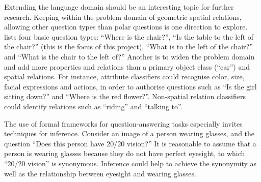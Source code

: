 Extending the language domain should be an interesting topic for further research.
Keeping within the problem domain of geometric spatial relations, allowing other question types than polar questions is one direction to explore.
\citet[p. 156]{DobnikTeachingmobilerobots2009} lists four basic question types:
``Where is the chair?'',
``Is the table to the left of the chair?'' (this is the focus of this project),
``What is to the left of the chair?'' and
``What is the chair to the left of?''
Another is to widen the problem domain and add more properties and relations than a primary object class (``car'') and spatial relations.
For instance, attribute classifiers could recognise color, size, facial expressions and actions, in order to authorise questions such as ``Is the girl sitting down?'' and ``Where is the red flower?''.
Non-spatial relation classifiers could identify relations such as ``riding'' and ``talking to''.

The use of formal frameworks for question-answering tasks especially invites techniques for inference.
Consider an image of a person wearing glasses, and the question ``Does this person have 20/20 vision?''
It is reasonable to assume that a person is wearing glasses because they do not have perfect eyesight, to which ``20/20 vision'' is synonymous.
Inference could help to achieve the synonymity as well as the relationship between eyesight and wearing glasses.


